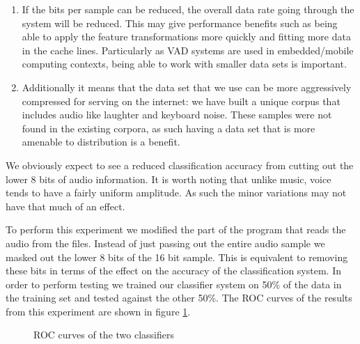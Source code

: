 \documentclass[ %
                    author={Sam Phippen},
                supervisor={Dr. Rafal Bogacz},
                     title={Real time voice activity detectors in noisy personal computing environments},
                  subtitle={},
                    degree={MEng},
                      year={2012} ]{thesis}
\begin{document}
\begin{enumerate}

    \item If the bits per sample can be reduced, the overall data rate going
        through the system will be reduced. This may give performance benefits
        such as being able to apply the feature transformations more quickly
        and fitting more data in the cache lines. Particularly as VAD systems
        are used in embedded/mobile computing contexts, being able to work with
        smaller data sets is important.

    \item Additionally it means that the data set that we use can be more
        aggressively compressed for serving on the internet: we have built a
        unique corpus that includes audio like laughter and keyboard noise.
        These samples were not found in the existing corpora, as such having
        a data set that is more amenable to distribution is a benefit.

\end{enumerate}

We obviously expect to see a reduced classification accuracy from cutting out
the lower 8 bits of audio information. It is worth noting that unlike music,
voice tends to have a fairly uniform amplitude. As such the minor variations
may not have that much of an effect.

To perform this experiment we modified the part of the program that reads the
audio from the files. Instead of just passing out the entire audio sample we
masked out the lower 8 bits of the 16 bit sample. This is equivalent to
removing these bits in terms of the effect on the accuracy of the
classification system. In order to perform testing we trained our classifier
system on 50\% of the data in the training set and tested against the other
50\%. The ROC curves of the results from this experiment are shown in
figure \ref{fig:roc-bitcrush}.

\begin{figure}
    \caption{ROC curves of the two classifiers}
    \label{fig:roc-bitcrush}
\end{figure}
\end{document}
